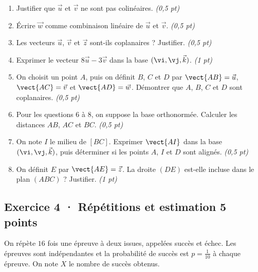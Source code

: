 \begin{enumerate}

\item Justifier que $\vec u$ et $\vec v$ ne sont pas colinéaires. \hfill\textit{(0,5 pt)}

\item Écrire $\vec w$ comme combinaison linéaire de $\vec u$ et $\vec v$. \hfill\textit{(0,5 pt)}

\item Les vecteurs $\vec u$, $\vec v$ et $\vec z$ sont-ils coplanaires ? Justifier. \hfill\textit{(0,5 pt)}

\item Exprimer le vecteur $8\vec u-3\vec v$ dans la base $(\vi,\vj,\vec k)$. \hfill\textit{(1 pt)}

\item On choisit un point $A$, puis on définit $B$, $C$ et $D$ par $\vect{AB}=\vec u$, $\vect{AC}=\vec v$ et $\vect{AD}=\vec w$. Démontrer que $A$, $B$, $C$ et $D$ sont coplanaires. \hfill\textit{(0,5 pt)}

\item Pour les questions 6 à 8, on suppose la base orthonormée. Calculer les distances $AB$, $AC$ et $BC$. \hfill\textit{(0,5 pt)}

\item On note $I$ le milieu de $[BC]$. Exprimer $\vect{AI}$ dans la base $(\vi,\vj,\vec k)$, puis déterminer si les points $A$, $I$ et $D$ sont alignés. \hfill\textit{(0,5 pt)}

\item On définit $E$ par $\vect{AE}=\vec z$. La droite $(DE)$ est-elle incluse dans le plan $(ABC)$ ? Justifier. \hfill\textit{(1 pt)}

\end{enumerate}

\subsection*{Exercice 4 · Répétitions et estimation \hfill 5 points}On répète $16$ fois une épreuve à deux issues, appelées succès et échec. Les épreuves sont indépendantes et la probabilité de succès est $p=\frac{1}{10}$ à chaque épreuve. On note $X$ le nombre de succès obtenus.

